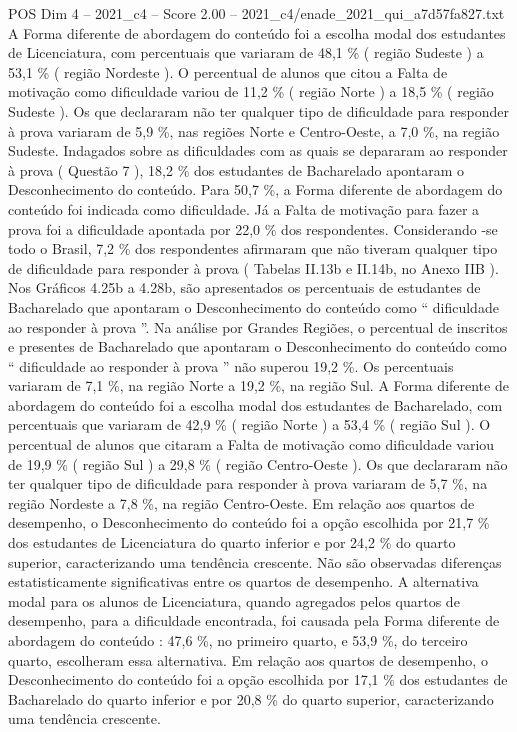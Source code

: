 \begin{textsample}{POS Dim 4 – 2021\_c4 – Score 2.00 – 2021\_c4/enade\_2021\_qui\_a7d57fa827.txt}
A Forma diferente de abordagem do conteúdo foi a escolha modal dos estudantes de Licenciatura, com percentuais que variaram de 48,1 \% ( região Sudeste ) a 53,1 \% ( região Nordeste ).
O percentual de alunos que citou a Falta de motivação como dificuldade variou de 11,2 \% ( região Norte ) a 18,5 \% ( região Sudeste ).
Os que declararam não ter qualquer tipo de dificuldade para responder à prova variaram de 5,9 \%, nas regiões Norte e Centro-Oeste, a 7,0 \%, na região Sudeste.
Indagados sobre as dificuldades com as quais se depararam ao responder à prova ( Questão 7 ), 18,2 \% dos estudantes de Bacharelado apontaram o Desconhecimento do conteúdo.
Para 50,7 \%, a Forma diferente de abordagem do conteúdo foi indicada como dificuldade.
Já a Falta de motivação para fazer a prova foi a dificuldade apontada por 22,0 \% dos respondentes.
Considerando -se todo o Brasil, 7,2 \% dos respondentes afirmaram que não tiveram qualquer tipo de dificuldade para responder à prova ( Tabelas II.13b e II.14b, no Anexo IIB ).
Nos Gráficos 4.25b a 4.28b, são apresentados os percentuais de estudantes de Bacharelado que apontaram o Desconhecimento do conteúdo como “ dificuldade ao responder à prova ”.
Na análise por Grandes Regiões, o percentual de inscritos e presentes de Bacharelado que apontaram o Desconhecimento do conteúdo como “ dificuldade ao responder à prova ” não superou 19,2 \%.
Os percentuais variaram de 7,1 \%, na região Norte a 19,2 \%, na região Sul.
A Forma diferente de abordagem do conteúdo foi a escolha modal dos estudantes de Bacharelado, com percentuais que variaram de 42,9 \% ( região Norte ) a 53,4 \% ( região Sul ).
O percentual de alunos que citaram a Falta de motivação como dificuldade variou de 19,9 \% ( região Sul ) a 29,8 \% ( região Centro-Oeste ).
Os que declararam não ter qualquer tipo de dificuldade para responder à prova variaram de 5,7 \%, na região Nordeste a 7,8 \%, na região Centro-Oeste.
Em relação aos quartos de desempenho, o Desconhecimento do conteúdo foi a opção escolhida por 21,7 \% dos estudantes de Licenciatura do quarto inferior e por 24,2 \% do quarto superior, caracterizando uma tendência crescente.
Não são observadas diferenças estatisticamente significativas entre os quartos de desempenho.
A alternativa modal para os alunos de Licenciatura, quando agregados pelos quartos de desempenho, para a dificuldade encontrada, foi causada pela Forma diferente de abordagem do conteúdo : 47,6 \%, no primeiro quarto, e 53,9 \%, do terceiro quarto, escolheram essa alternativa.
Em relação aos quartos de desempenho, o Desconhecimento do conteúdo foi a opção escolhida por 17,1 \% dos estudantes de Bacharelado do quarto inferior e por 20,8 \% do quarto superior, caracterizando uma tendência crescente.

\end{textsample}
